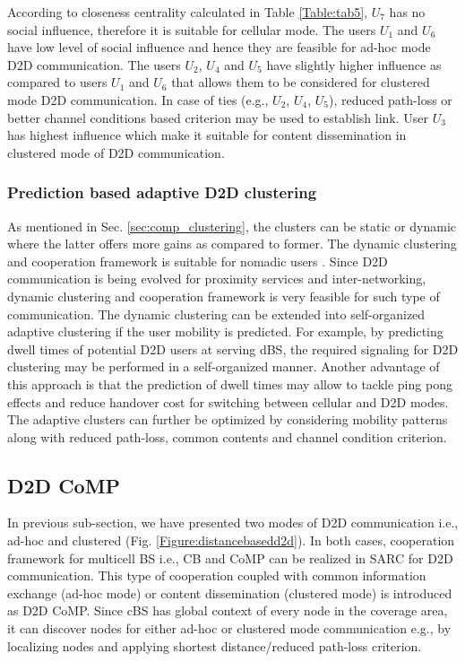 \documentclass[article,10pt,twocolumn]{IEEEtran}
\begin{document}
According to closeness centrality calculated in Table \ref{Table:tab5}, $U_7$ has no social influence, therefore it is suitable for cellular mode. The users $U_1$ and $U_6$ have low level of social influence and hence they are feasible for ad-hoc mode D2D communication. The users $U_2$, $U_4$ and $U_5$ have slightly higher influence as compared to users $U_1$ and $U_6$ that allows them to be considered for clustered mode D2D communication. In case of ties (e.g., $U_2$, $U_4$, $U_5$), reduced path-loss or better channel conditions based criterion may be used to establish link. User $U_3$ has highest influence which make it suitable for content dissemination in clustered mode of D2D communication.
\subsubsection{Prediction based adaptive D2D clustering}
As mentioned in Sec. \ref{sec:comp_clustering}, the clusters can be static or dynamic where the latter offers more gains as compared to former. The dynamic clustering and cooperation framework is suitable for nomadic users \citep{marsch_coordinated_2011}. Since D2D communication is being evolved for proximity services and inter-networking, dynamic clustering and cooperation framework is very feasible for such type of communication. The dynamic clustering can be extended into self-organized adaptive clustering if the user mobility is predicted. For example, by predicting dwell times of potential D2D users at serving dBS, the required signaling for D2D clustering may be performed in a self-organized manner. Another advantage of this approach is that the prediction of dwell times may allow to tackle ping pong effects and reduce handover cost for switching between cellular and D2D modes. The adaptive clusters can further be optimized by considering mobility patterns along with reduced path-loss, common contents and channel condition criterion.
\subsection{D2D CoMP}\label{sec:d2d_comp}
In previous sub-section, we have presented two modes of D2D communication i.e., ad-hoc and clustered (Fig. \ref{Figure:distancebasedd2d}). In both cases, cooperation framework for multicell BS i.e., CB and CoMP can be realized in SARC for D2D communication. This type of cooperation coupled with common information exchange (ad-hoc mode) or content dissemination (clustered mode) is introduced as D2D CoMP. Since cBS has global context of every node in the coverage area, it can discover nodes for either ad-hoc or clustered mode communication e.g., by localizing nodes and applying shortest distance/reduced path-loss criterion. 
\end{document}

